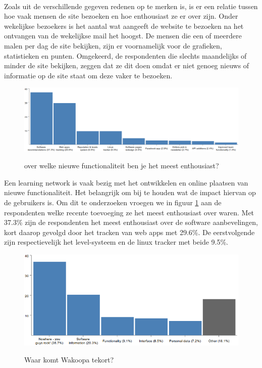       \paragraph{}Zoals uit de verschillende gegeven redenen op te merken is, is er een relatie tussen hoe vaak mensen de site bezoeken en hoe enthousiast ze er over zijn. Onder wekelijkse bezoekers is het aantal wat aangeeft de website te bezoeken na het ontvangen van de wekelijkse mail het hoogst. De mensen die een of meerdere malen per dag de site bekijken, zijn er voornamelijk voor de grafieken, statistieken en punten. Omgekeerd, de respondenten die slechts maandelijks of minder de site bekijken, zeggen dat ze dit doen omdat er niet genoeg nieuws of informatie op de site staat om deze vaker te bezoeken.

        \begin{figure}
          \begin{center}
          \caption{over welke nieuwe functionaliteit ben je het meest enthousiast?}
            \includegraphics[width=\textwidth]{../images/enquete/recent-additions}
          \label{fig:enthousiast}
          \end{center}
        \end{figure}

      Een learning network is vaak bezig met het ontwikkelen en online plaatsen van nieuwe functionaliteit. Het belangrijk om bij te houden wat de impact hiervan op de gebruikers is. Om dit te onderzoeken vroegen we in figuur \ref{fig:enthousiast} aan de respondenten welke recente toevoeging ze het meest enthousiast over waren. Met 37.3\% zijn de respondenten het meest enthousiast over de software aanbevelingen, kort daarop gevolgd door het tracken van web apps met 29.6\%. De eerstvolgende zijn respectievelijk het level-systeem en de linux tracker met beide 9.5\%.

        \begin{figure}
          \begin{center}
          \caption{Waar komt Wakoopa tekort?}
            \includegraphics[width=\textwidth]{../images/enquete/improvement}
          \label{fig:improvement}
          \end{center}
        \end{figure}

